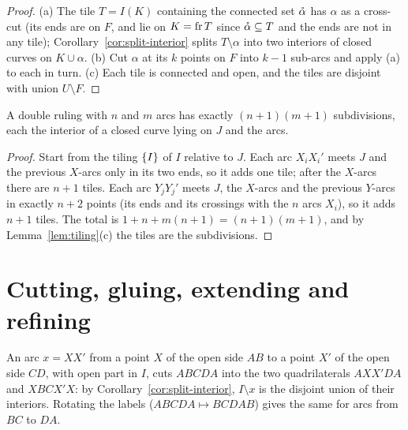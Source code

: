 \begin{proof}
(a) The tile $T=I(K)$ containing the connected set $\mathring{\alpha}$ has $\alpha$ as a cross-cut (its ends are on $F$, and lie on
$K=\operatorname{fr} T$ since $\mathring{\alpha}\subseteq T$ and the ends are not in any tile); Corollary~\ref{cor:split-interior} splits $T\setminus\alpha$
into two interiors of closed curves on $K\cup\alpha$. (b) Cut $\alpha$ at its $k$ points on $F$ into $k-1$ sub-arcs and apply (a)
to each in turn. (c) Each tile is connected and open, and the tiles are disjoint with union $U\setminus F$.
\end{proof}


\begin{proposition}\label{prop:cells-count}
A double ruling with $n$ and $m$ arcs has exactly $(n+1)(m+1)$ subdivisions, each the interior of a closed curve lying on
$J$ and the arcs.
\end{proposition}

\begin{proof}
Start from the tiling $\left\{ I \right\}$ of $I$ relative to $J$. Each arc $X_iX_i'$ meets $J$ and the previous $X$-arcs only in its two
ends, so it adds one tile; after the $X$-arcs there are $n+1$ tiles. Each arc $Y_jY_j'$ meets $J$, the $X$-arcs and the previous
$Y$-arcs in exactly $n+2$ points (its ends and its crossings with the $n$ arcs $X_i$), so it adds $n+1$ tiles. The total is
$1+n+m(n+1)=(n+1)(m+1)$, and by Lemma~\ref{lem:tiling}(c) the tiles are the subdivisions.
\end{proof}


\section{Cutting, gluing, extending and refining}

An arc $x=XX'$ from a point $X$ of the open side $AB$ to a point $X'$ of the open side $CD$, with open part in $I$, cuts $ABCDA$
into the two quadrilaterals $AXX'DA$ and $XBCX'X$: by Corollary~\ref{cor:split-interior}, $I\setminus x$ is the disjoint union of
their interiors. Rotating the labels ($ABCDA\mapsto BCDAB$) gives the same for arcs from $BC$ to $DA$.

